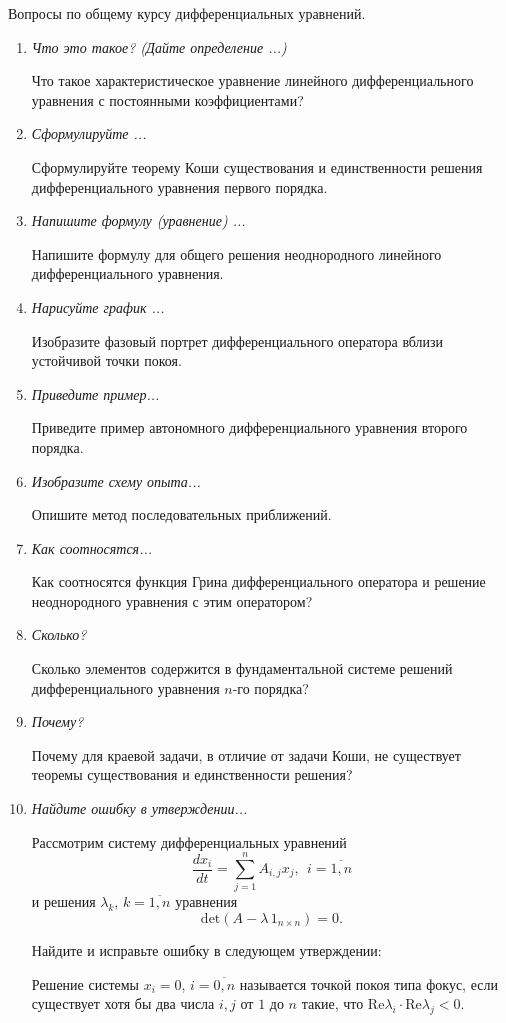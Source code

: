 \documentclass[a4paper, 12pt]{article}
\begin{document}
Вопросы по общему курсу дифференциальных уравнений.
\begin{enumerate}
	\item \textit{Что это такое? (Дайте определение ...)}

		Что такое характеристическое уравнение линейного дифференциального уравнения с постоянными коэффициентами?

	\item\textit{Сформулируйте ...}

		Сформулируйте теорему Коши существования и единственности решения дифференциального уравнения первого порядка.

	\item\textit{Напишите формулу (уравнение) ...}

		Напишите формулу для общего решения неоднородного линейного дифференциального уравнения.

	\item \textit{Нарисуйте график ...}

		Изобразите фазовый портрет дифференциального оператора вблизи устойчивой точки покоя.

	\item \textit{Приведите пример...}

		Приведите пример автономного дифференциального уравнения второго порядка.

	\item \textit{Изобразите схему опыта...}

		Опишите метод последовательных приближений.

	\item \textit{Как соотносятся...}

		Как соотносятся функция Грина дифференциального оператора и решение неоднородного уравнения с этим оператором?

	\item \textit{Сколько?}

		Сколько элементов содержится в фундаментальной системе решений дифференциального уравнения $n$-го порядка?

	\item \textit{Почему?}

		Почему для краевой задачи, в отличие от задачи Коши, не существует теоремы существования и единственности решения?

	\item \textit{Найдите ошибку в утверждении...}

		Рассмотрим систему дифференциальных уравнений
		$$\frac{d x_i}{d t} = \sum_{j=1}^{n} A_{i,j} x_j,\ \ i=\overline{1,n}$$
		и решения $\lambda_k$, $k=\overline{1,n}$ уравнения
		$$\mathrm{det}(A-\lambda\,1_{n\times n}) = 0.$$

		Найдите и исправьте ошибку в следующем утверждении:

		Решение системы $x_i = 0$, $i = \overline{0, n}$ называется точкой покоя типа фокус, если существует хотя бы два числа $i, j$ от $1$ до $n$ такие, что $\mathrm{Re} \lambda_i \cdot \mathrm{Re} \lambda_j < 0$.
\end{enumerate}
\end{document}
